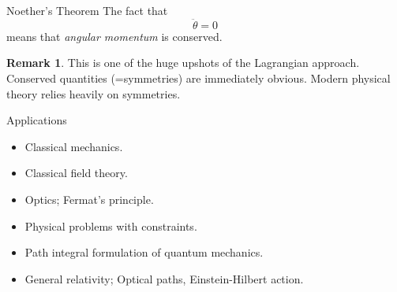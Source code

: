 \documentclass[usenames,dvipsnames]{beamer}
\theoremstyle{definition}
\newtheorem*{remark}{Remark}
\theoremstyle{theorem}
\begin{document}
        \begin{frame}{Noether's Theorem}
            The fact that
            \[
            \ddot{\theta}=0
            \]
            means that \emph{angular momentum} is conserved.  
            
            \begin{remark}
            This is one of the huge upshots of the Lagrangian approach. Conserved quantities (=symmetries) are immediately obvious.  Modern physical theory relies heavily on symmetries.
            \end{remark}
        \end{frame}
        
        \begin{frame}{Applications}
            \begin{itemize}
                \item Classical mechanics.
                \item Classical field theory.
                \item Optics; Fermat's principle.
                \item Physical problems with constraints.
                \item Path integral formulation of quantum mechanics.
                \item General relativity; Optical paths, Einstein-Hilbert action.
            \end{itemize}
        \end{frame}
    
        
\end{document}
